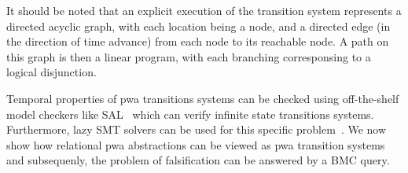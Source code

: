 It should be noted that an explicit execution of the transition system
represents a directed acyclic graph, with each location being a node,
and a directed edge (in the direction of time advance) from each node
to its reachable node. A path on this graph is then a linear program,
with each branching corresponsing to a logical disjunction.

Temporal properties of pwa transitions systems can be checked using
off-the-shelf model checkers like SAL~\cite{SAL-SRI} which can verify
infinite state transitions systems.  Furthermore, lazy SMT solvers can
be used for this specific problem~\cite{shoukry2017smc}. We now show
how relational pwa abstractions can be viewed as pwa transition
systems and subsequenly, the problem of falsification can be answered
by a BMC query.





